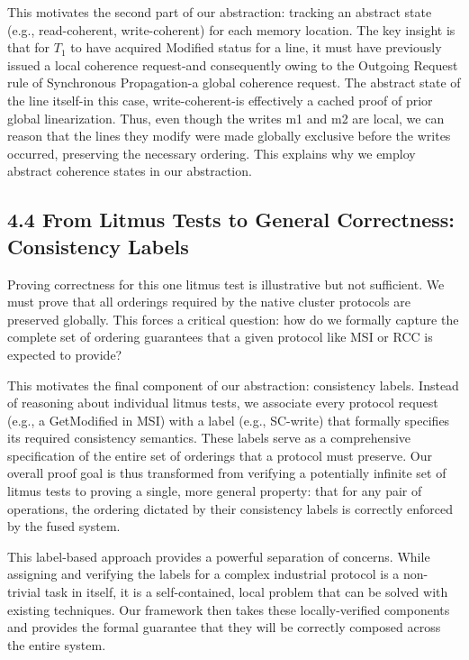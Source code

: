 \documentclass[10pt]{article}
\begin{document}
This motivates the second part of our abstraction: tracking an abstract state (e.g., read-coherent, write-coherent) for each memory location. The key insight is that for $T_{1}$ to have acquired Modified status for a line, it must have previously issued a local coherence request-and consequently owing to the Outgoing Request rule of Synchronous Propagation-a global coherence request. The abstract state of the line itself-in this case, write-coherent-is effectively a cached proof of prior global linearization. Thus, even though the writes m1 and m2 are local, we can reason that the lines they modify were made globally exclusive before the writes occurred, preserving the necessary ordering. This explains why we employ abstract coherence states in our abstraction.

\subsection*{4.4 From Litmus Tests to General Correctness: Consistency Labels}
Proving correctness for this one litmus test is illustrative but not sufficient. We must prove that all orderings required by the native cluster protocols are preserved globally. This forces a critical question: how do we formally capture the complete set of ordering guarantees that a given protocol like MSI or RCC is expected to provide?

This motivates the final component of our abstraction: consistency labels. Instead of reasoning about individual litmus tests, we associate every protocol request (e.g., a GetModified in MSI) with a label (e.g., SC-write) that formally specifies its required consistency semantics. These labels serve as a comprehensive specification of the entire set of orderings that a protocol must preserve. Our overall proof goal is thus transformed from verifying a potentially infinite set of litmus tests to proving a single, more general property: that for any pair of operations, the ordering dictated by their consistency labels is correctly enforced by the fused system.

This label-based approach provides a powerful separation of concerns. While assigning and verifying the labels for a complex industrial protocol is a non-trivial task in itself, it is a self-contained, local problem that can be solved with existing techniques. Our framework then takes these locally-verified components and provides the formal guarantee that they will be correctly composed across the entire system.
\end{document}
